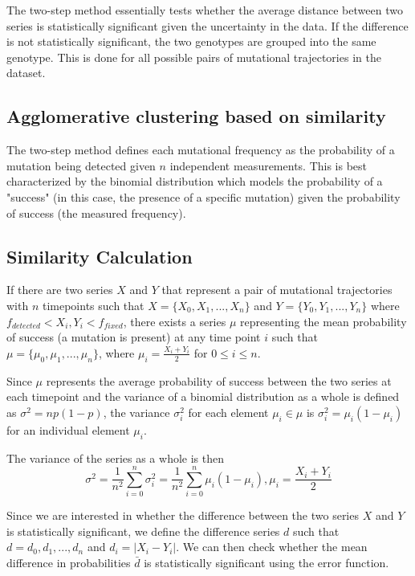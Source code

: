 \documentclass{report}
\begin{document}
The two-step method essentially tests whether the average distance between two series is statistically significant given the uncertainty in the data. If the difference is not statistically significant, the two genotypes are grouped into the same genotype. This is done for all possible pairs of mutational trajectories in the dataset.

\subsection{Agglomerative clustering based on similarity}

The two-step method defines each mutational frequency as the probability of a mutation being detected given $n$ independent measurements. This is best characterized by the binomial distribution which models the probability of a "success" (in this case, the presence of a specific mutation) given the probability of success (the measured frequency).

\subsection{Similarity Calculation}

If there are two series $X$ and $Y$ that represent a pair of mutational trajectories with $n$ timepoints such that $X=\{X_0,X_1,...,X_n\}$ 
and $Y=\{Y_0,Y_1,...,Y_n\}$ where $f_{detected} < X_i,Y_i < f_{fixed}$, there exists a series $\mu$ representing the mean probability of success 
(a mutation is present) at any time point $i$ such that $\mu=\{\mu_0,\mu_1,...,\mu_n\}$, where $\mu_i=\frac{X_i+Y_i}{2}$ for $0\le i \le n$.

Since $\mu$ represents the average probability of success between the two series at each timepoint and the variance of a binomial distribution as a whole is defined as $\sigma^2=np(1-p)$, the variance $\sigma_i^2$ for each element $\mu_i \in \mu$ is $\sigma_i^2=\mu_i(1-\mu_i)$ for an individual element $\mu_i$.

The variance of the series as a whole is then
$$
\sigma^2 = \frac{1}{n^2}\sum_{i=0}^n \sigma_i^2=\frac{1}{n^2}\sum_{i=0}^n \mu_i(1-\mu_i),
\mu_i=\frac{X_i+Y_i}{2}
$$

Since we are interested in whether the difference between the two series $X$ and $Y$ is statistically significant, we define the difference series $d$ such that $d={d_0,d_1,...,d_n}$ and $d_i=|X_i-Y_i|$. We can then check whether the mean difference in probabilities $\bar{d}$ is
statistically significant using the error function.
\end{document}
